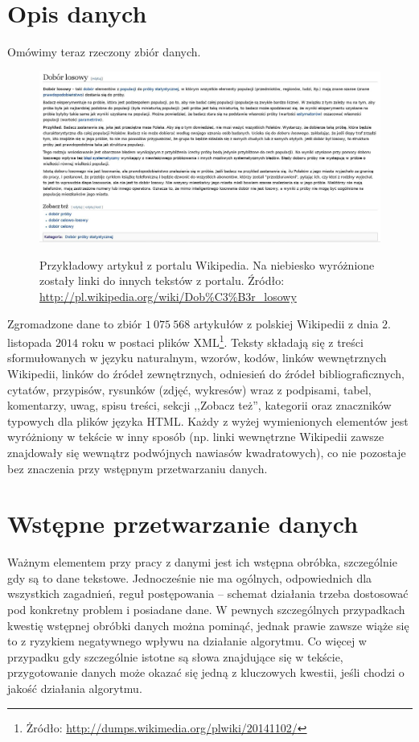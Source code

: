 \documentclass{praca1}
\begin{document}
\section{Opis danych}

Omówimy teraz rzeczony zbiór danych.

\begin{figure}[!h]
  \centering
  \includegraphics[width=450pt]{wiki2.jpg}\\
  \caption{Przykładowy artykuł z portalu Wikipedia. Na niebiesko wyróżnione zostały linki do innych tekstów z portalu. Źródło: \url{http://pl.wikipedia.org/wiki/Dob\%C3\%B3r\_losowy}}\label{wiki}
\end{figure}

Zgromadzone dane to zbiór $1\ 075\ 568$ artykułów z polskiej Wikipedii z dnia $2.$ listopada $2014$ roku w postaci plików XML\footnote{Żródło: \url{http://dumps.wikimedia.org/plwiki/20141102/}}. Teksty składają się z treści sformułowanych w języku naturalnym, wzorów, kodów, linków wewnętrznych Wikipedii, linków do źródeł zewnętrznych, odniesień do źródeł bibliograficznych, cytatów, przypisów, rysunków (zdjęć, wykresów) wraz z podpisami, tabel, komentarzy, uwag, spisu treści, sekcji ,,Zobacz też'', kategorii oraz znaczników typowych dla plików języka HTML. Każdy z wyżej wymienionych elementów jest wyróżniony w tekście w inny sposób (np. linki wewnętrzne Wikipedii zawsze znajdowały się wewnątrz podwójnych nawiasów kwadratowych), co nie pozostaje bez znaczenia przy wstępnym przetwarzaniu danych.

\section{Wstępne przetwarzanie danych}

Ważnym elementem przy pracy z danymi jest ich wstępna obróbka, szczególnie gdy są to dane tekstowe. Jednocześnie nie ma ogólnych, odpowiednich dla wszystkich zagadnień, reguł postępowania -- schemat działania trzeba dostosować pod konkretny problem i posiadane dane. W pewnych szczególnych przypadkach kwestię wstępnej obróbki danych można pominąć, jednak prawie zawsze wiąże się to z ryzykiem negatywnego wpływu na działanie algorytmu. Co więcej w przypadku gdy szczególnie istotne są słowa znajdujące się w tekście, przygotowanie danych może okazać się jedną z kluczowych kwestii, jeśli chodzi o jakość działania algorytmu.
\end{document}
